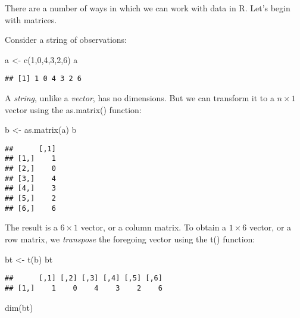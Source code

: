 \documentclass[
  oneside]{book}
\newenvironment{Shaded}{\begin{snugshade}}{\end{snugshade}}
\newcommand{\DecValTok}[1]{\textcolor[rgb]{0.00,0.00,0.81}{#1}}
\newcommand{\FunctionTok}[1]{\textcolor[rgb]{0.00,0.00,0.00}{#1}}
\newcommand{\NormalTok}[1]{#1}
\newcommand{\OtherTok}[1]{\textcolor[rgb]{0.56,0.35,0.01}{#1}}
\begin{document}
There are a number of ways in which we can work with data in R. Let's begin with matrices.

Consider a string of observations:

\begin{Shaded}
\begin{Highlighting}[]
\NormalTok{a }\OtherTok{\textless{}{-}} \FunctionTok{c}\NormalTok{(}\DecValTok{1}\NormalTok{,}\DecValTok{0}\NormalTok{,}\DecValTok{4}\NormalTok{,}\DecValTok{3}\NormalTok{,}\DecValTok{2}\NormalTok{,}\DecValTok{6}\NormalTok{)}
\NormalTok{a}
\end{Highlighting}
\end{Shaded}

\begin{verbatim}
## [1] 1 0 4 3 2 6
\end{verbatim}

A \emph{string}, unlike a \emph{vector}, has no dimensions. But we can transform it to a \(n \times 1\) vector using the as.matrix() function:

\begin{Shaded}
\begin{Highlighting}[]
\NormalTok{b }\OtherTok{\textless{}{-}} \FunctionTok{as.matrix}\NormalTok{(a)}
\NormalTok{b}
\end{Highlighting}
\end{Shaded}

\begin{verbatim}
##      [,1]
## [1,]    1
## [2,]    0
## [3,]    4
## [4,]    3
## [5,]    2
## [6,]    6
\end{verbatim}

The result is a \(6 \times 1\) vector, or a column matrix. To obtain a \(1 \times 6\) vector, or a row matrix, we \emph{transpose} the foregoing vector using the t() function:

\begin{Shaded}
\begin{Highlighting}[]
\NormalTok{bt }\OtherTok{\textless{}{-}} \FunctionTok{t}\NormalTok{(b)}
\NormalTok{bt}
\end{Highlighting}
\end{Shaded}

\begin{verbatim}
##      [,1] [,2] [,3] [,4] [,5] [,6]
## [1,]    1    0    4    3    2    6
\end{verbatim}

\begin{Shaded}
\begin{Highlighting}[]
\FunctionTok{dim}\NormalTok{(bt)}
\end{Highlighting}
\end{Shaded}
\end{document}
